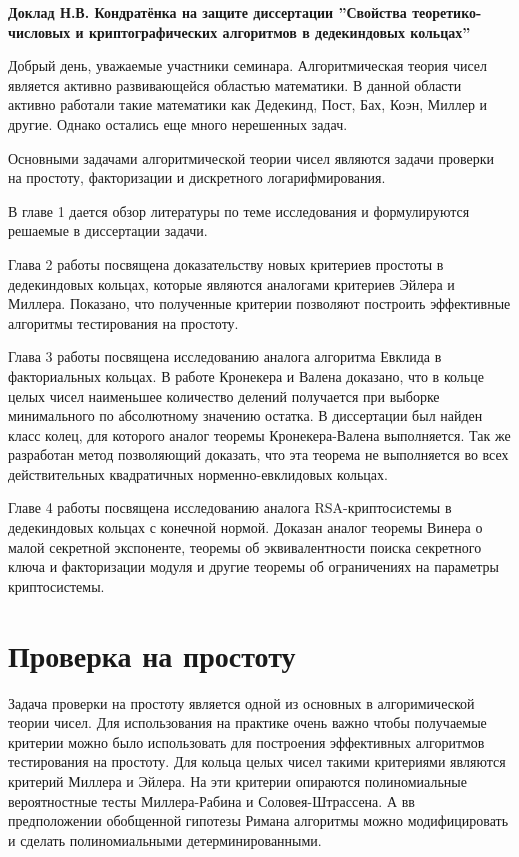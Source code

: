 \documentclass[a4paper,12pt]{article} %
\begin{document}
\begin{center}
    \textbf{Доклад Н.В. Кондратёнка на защите диссертации ''Свойства теоретико-числовых и криптографических алгоритмов в дедекиндовых кольцах''}
\end{center}

Добрый день, уважаемые участники семинара.
Алгоритмическая теория чисел является активно развивающейся областью математики.
В данной области активно работали такие математики как Дедекинд, Пост, Бах, Коэн, Миллер и другие.
Однако остались еще много нерешенных задач.

Основными задачами алгоритмической теории чисел являются задачи проверки на простоту, факторизации и дискретного логарифмирования.

В главе 1 дается обзор литературы по теме исследования и формулируются решаемые в диссертации задачи.

Глава 2 работы посвящена доказательству новых критериев простоты в дедекиндовых кольцах, которые являются аналогами критериев Эйлера и Миллера.
Показано, что полученные критерии позволяют построить эффективные алгоритмы тестирования на простоту.

Глава 3 работы посвящена исследованию аналога алгоритма Евклида в факториальных кольцах.
В работе Кронекера и Валена доказано, что в кольце целых чисел наименьшее количество делений получается при выборке минимального по абсолютному значению остатка.
В диссертации был найден класс колец, для которого аналог теоремы Кронекера-Валена выполняется.
Так же разработан метод позволяющий доказать, что эта теорема не выполняется во всех действительных квадратичных норменно-евклидовых кольцах.
    
Главе 4 работы посвящена исследованию аналога RSA-криптосистемы в дедекиндовых кольцах с конечной нормой.
Доказан аналог теоремы Винера о малой секретной экспоненте, теоремы об эквивалентности поиска секретного ключа и факторизации модуля и другие теоремы об ограничениях на параметры криптосистемы.

\section{Проверка на простоту}

Задача проверки на простоту является одной из основных в алгоримической теории чисел.
Для использования на практике очень важно чтобы получаемые критерии можно было использовать для построения эффективных алгоритмов тестирования на простоту.
Для кольца целых чисел такими критериями являются критерий Миллера и Эйлера.
На эти критерии опираются полиномиальные вероятностные тесты Миллера-Рабина и Соловея-Штрассена.
А вв предположении обобщенной гипотезы Римана алгоритмы можно модифицировать и сделать полиномиальными детерминированными.
\end{document}

